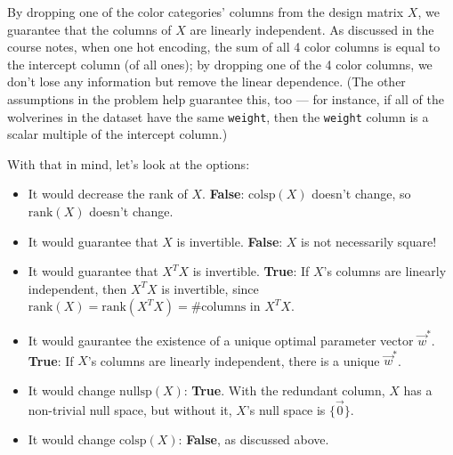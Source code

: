\documentclass[11pt]{article}
\begin{document}
\begin{prob}
\begin{subprob}

\begin{solution}
By dropping one of the color categories' columns from the design matrix $X$, we guarantee that the columns of $X$ are linearly independent. As discussed in the course notes, when one hot encoding, the sum of all 4 color columns is equal to the intercept column (of all ones); by dropping one of the 4 color columns, we don't lose any information but remove the linear dependence. (The other assumptions in the problem help guarantee this, too --- for instance, if all of the wolverines in the dataset have the same \texttt{weight}, then the \texttt{weight} column is a scalar multiple of the intercept column.)

With that in mind, let's look at the options:

\begin{itemize}
    \item It would decrease the rank of $X$. \textbf{False}: $\text{colsp}(X)$ doesn't change, so $\text{rank}(X)$ doesn't change.
    \item It would guarantee that $X$ is invertible. \textbf{False}: $X$ is not necessarily square!
    \item It would guarantee that $X^TX$ is invertible. \textbf{True}: If $X$'s columns are linearly independent, then $X^TX$ is invertible, since $\text{rank}(X) = \text{rank}(X^TX) = \text{\# columns in } X^TX$.
    \item It would gaurantee the existence of a unique optimal parameter vector $\vec w^*$. \textbf{True}: If $X$'s columns are linearly independent, there is a unique $\vec w^*$.
    \item It would change $\text{nullsp}(X)$: \textbf{True}. With the redundant column, $X$ has a non-trivial null space, but without it, $X$'s null space is $\{ \vec 0 \}$.
    \item It would change $\text{colsp}(X)$: \textbf{False}, as discussed above.
\end{itemize}

\end{solution}
\end{subprob}
\end{prob}
    

\newpage
\end{document}
